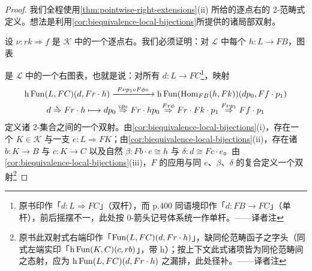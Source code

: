 \begin{proof}
我们全程使用\cref{thm:pointwise-right-extensions}(ii) 所给的逐点右\trExtension{}的 2-范畴式定义。想法是利用\cref{cor:biequivalence-local-bijections}所提供的诸局部双射。

设 $\nu\colon rk\Rightarrow f$ 是 $\mathcal{K}$ 中的一个逐点右\trExtension。我们必须证明：对 $\mathcal{L}$ 中每个 $h\colon L\to FB$，图表
\begin{center}
\end{center}
是 $\mathcal{L}$ 中的一个右\trExtension{}图表，也就是说：对所有 $d\colon L\to FC$\footnote{原书印作「$d\colon L\Rightarrow FC$」（双杆），而 p.400 同语境印作「$d\colon FB\to FC$」（单杆），前后摇摆不一，此处按 0-箭头记号体系统一作单杆。——译者注}，映射
\begin{equation*}
\begin{gathered}
\hFun(L,FC)(d,Fr\cdot h)\xrightarrow{\ F\nu p_{1}\circ F\phi\circ\ }\hFun(\HomFB(h,Fk))(dp_{0},Ff\cdot p_{1})\\
d\overset{\varsigma}{\Rightarrow}Fr\cdot h\longmapsto dp_{0}\overset{\varsigma p_{0}}{\Rightarrow}Fr\cdot hp_{0}\overset{Fr\phi}{\Rightarrow}Fr\cdot Fk\cdot p_{1}\overset{F\nu p_{1}}{\Rightarrow}Ff\cdot p_{1}
\end{gathered}
\end{equation*}
定义诸 2-\trCell{}集合之间的一个双射。由\cref{cor:biequivalence-local-bijections}(i)，存在一个\trInfinityCategory{} $K\in\mathcal{K}$ 与一支\trEquivalence{} $e\colon L\Rightarrow FK$；由\cref{cor:biequivalence-local-bijections}(ii)，存在诸\trFunctor{} $b\colon K\to B$ 与 $c\colon K\to C$ 以及自然\trIsomorphism{} $\beta\colon Fb\cdot e\cong h$ 与 $\delta\colon d\cong Fc\cdot e$。由\cref{cor:biequivalence-local-bijections}(iii)，$F$ 的应用与同 $e$、$\beta$、$\delta$ 的复合定义一个双射\footnote{原书此双射式右端印作「$\operatorname{Fun}(L,FC)(d,Fr\cdot h)$」，缺同伦范畴函子之字头（同式左端实印「$\mathrm{h}\operatorname{Fun}(K,C)(c,rb)$」，带 $\mathrm{h}$）；按上下文此式诸项皆为同伦范畴间之态射，应为 $\mathrm{h}\operatorname{Fun}(L,FC)(d,Fr\cdot h)$ 之漏排，此处径补。——译者注}

\end{proof}
